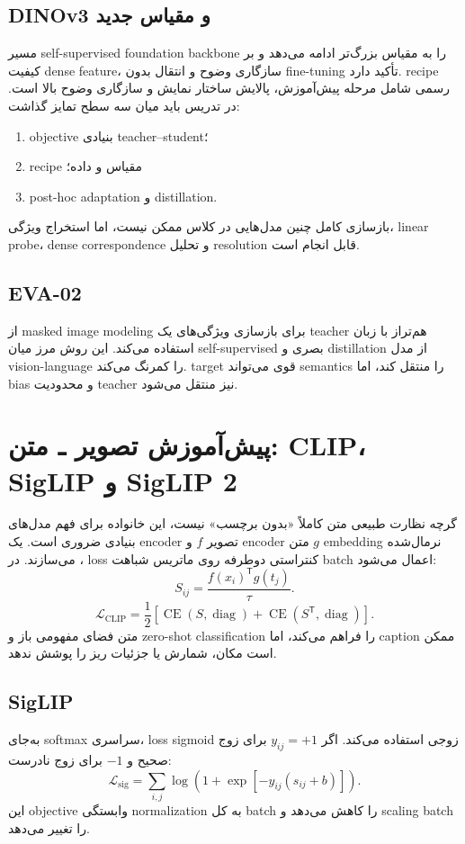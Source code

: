 \documentclass[12pt,openany,oneside]{book}
\newcommand{\trans}{^{\mathsf T}}
\newcommand{\CE}{\operatorname{CE}}
\begin{document}
\subsection{DINOv3 و مقیاس جدید}
 مسیر self-supervised foundation backbone را به مقیاس بزرگ‌تر ادامه می‌دهد و بر کیفیت dense feature، سازگاری وضوح و انتقال بدون fine-tuning تأکید دارد. recipe رسمی شامل مرحله پیش‌آموزش، پالایش ساختار نمایش و سازگاری وضوح بالا است. در تدریس باید میان سه سطح تمایز گذاشت:
\begin{enumerate}
\item objective بنیادی teacher--student؛
\item recipe مقیاس و داده؛
\item post-hoc adaptation و distillation.
\end{enumerate}
بازسازی کامل چنین مدل‌هایی در کلاس ممکن نیست، اما استخراج ویژگی، linear probe، dense correspondence و تحلیل resolution قابل انجام است.

\subsection{EVA-02}
 از masked image modeling برای بازسازی ویژگی‌های یک teacher هم‌تراز با زبان استفاده می‌کند. این روش مرز میان self-supervised بصری و distillation از مدل vision-language را کمرنگ می‌کند. target قوی می‌تواند semantics را منتقل کند، اما bias و محدودیت teacher نیز منتقل می‌شود.

\section{پیش‌آموزش تصویر ـ متن: CLIP، SigLIP و SigLIP 2}
گرچه نظارت طبیعی متن کاملاً «بدون برچسب» نیست، این خانواده برای فهم مدل‌های بنیادی ضروری است. یک encoder تصویر $f$ و encoder متن $g$ embedding نرمال‌شده می‌سازند. در ، loss کنتراستی دوطرفه روی ماتریس شباهت batch اعمال می‌شود:
\begin{equation}
S_{ij}=\frac{f(x_i)\trans g(t_j)}{\tau}.
\end{equation}
\begin{equation}
\mathcal L_{\mathrm{CLIP}}
=\frac12\left[\CE(S,\operatorname{diag})+\CE(S\trans,\operatorname{diag})\right].
\end{equation}
متن فضای مفهومی باز و zero-shot classification را فراهم می‌کند، اما caption ممکن است مکان، شمارش یا جزئیات ریز را پوشش ندهد.

\subsection{SigLIP}
 به‌جای softmax سراسری، loss sigmoid زوجی استفاده می‌کند. اگر $y_{ij}=+1$ برای زوج صحیح و $-1$ برای زوج نادرست:
\begin{equation}
\mathcal L_{\mathrm{sig}}
=\sum_{i,j}\log\left(1+\exp[-y_{ij}(s_{ij}+b)]\right).
\end{equation}
این objective وابستگی normalization به کل batch را کاهش می‌دهد و scaling batch را تغییر می‌دهد.
\end{document}

